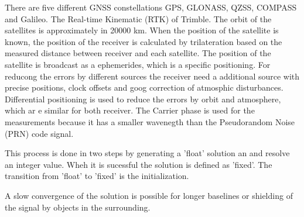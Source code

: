 There are five different GNSS constellations GPS, GLONASS, QZSS, COMPASS and Galileo.
The Real-time Kinematic (RTK) of Trimble.
The orbit of the satellites is approximately in 20000 km.
When the position of the satellite is known, the position of the receiver is calculated by trilateration based on the measured distance between receiver and each satellite.
The position of the satellite is broadcast as a ephemerides, which is a specific positioning.
For reducong the errors by different sources the receiver need a additional source with precise positions, clock offsets and goog correction of atmosphic disturbances. 
Differential positioning is used to reduce the errors by orbit and atmosphere, which ar e similar for both receiver. 
The Carrier phase is used for the measurements because it has a smaller wavenegth than the Pseudorandom Noise (PRN) code signal.



This process is done in two steps by generating a 'float' solution an and resolve an integer value. 
Wheh it is sucessful the solution is defined as 'fixed'.
The transition from 'float' to 'fixed' is the initialization.


A slow convergence of the solution is possible for longer baselines or shielding of the signal by objects in the surrounding.

